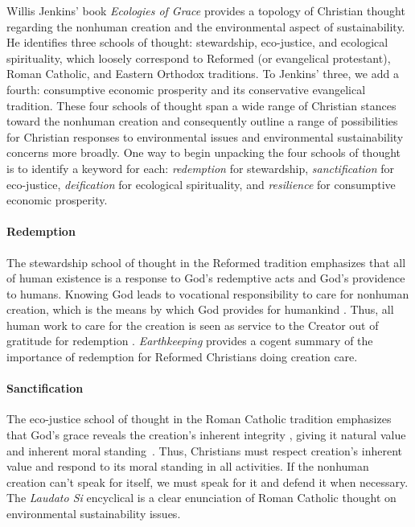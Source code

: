 \documentclass[12pt]{article}
\begin{document}
Willis Jenkins' book \emph{Ecologies of Grace} \autocite{Jenkins:2008}
provides a topology of Christian thought regarding the 
nonhuman creation and the
environmental aspect of sustainability.
He identifies three schools of thought:
stewardship, 
eco-justice, and 
ecological spirituality,
which loosely correspond to 
Reformed (or evangelical protestant), 
Roman Catholic, and 
Eastern Orthodox 
traditions.
To Jenkins' three, we add a fourth:
consumptive economic prosperity and
its conservative evangelical tradition. 
These four schools of thought 
span a wide range of Christian stances toward the nonhuman creation
and 
consequently outline a range of possibilities 
for Christian responses to environmental issues
and environmental sustainability concerns more broadly.
One way to begin unpacking the four schools of thought 
is to identify a keyword for each:
\emph{redemption} for stewardship, 
\emph{sanctification} for eco-justice,
\emph{deification} for ecological spirituality, and
\emph{resilience} for consumptive economic prosperity.

\paragraph{Redemption} 
\label{sec:redemption}

The stewardship school of thought in the Reformed tradition
emphasizes that all of human existence
is a response to God's redemptive acts
and God's providence to humans.
Knowing God leads to vocational responsibility 
to care for nonhuman creation,
which is the means by which God provides for humankind \autocite{Jenkins:2008} \autocite[19]{Jenkins:2008}. 
Thus, all human work to care for the creation 
is seen as service to the Creator
out of gratitude for redemption \autocite[77]{Jenkins:2008}.
\emph{Earthkeeping} \autocite{Wilkenson:1980aa} provides a cogent summary
of the importance of redemption for Reformed Christians doing creation care.

\paragraph{Sanctification} 
\label{sec:sanctification}

The eco-justice school of thought in the Roman Catholic tradition
emphasizes that God's grace reveals the creation's 
inherent integrity \autocite[19]{Jenkins:2008}, 
giving it natural value and inherent moral standing~\autocite{Joldersma:2019}. 
Thus, Christians must respect creation's inherent value and 
respond to its moral standing in all activities.
If the nonhuman creation can't speak for itself, 
we must speak for it and defend it when necessary.
The \emph{Laudato Si} encyclical \autocite{Pope-Francis:2015aa} 
is a clear enunciation of Roman Catholic thought
on environmental sustainability issues.
\end{document}
